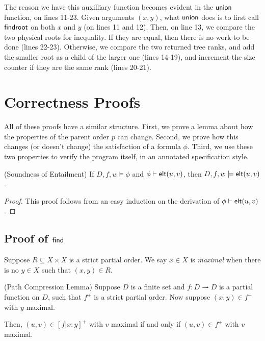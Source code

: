 The reason we have this auxilliary function becomes evident in the
$\mathsf{union}$ function, on lines 11-23. Given arguments $(x,y)$, what
$\mathsf{union}$ does is to first call $\mathsf{findroot}$ on both $x$ and $y$ (on
lines 11 and 12). Then, on line 13, we compare the two physical roots
for inequality. If they are equal, then there is no work to be done
(lines 22-23). Otherwise, we compare the two returned tree ranks, and
add the smaller root as a child of the larger one (lines 14-19), and
increment the size counter if they are the same rank (lines 20-21).

\section{Correctness Proofs}

All of these proofs have a similar structure. First, we prove a lemma about how 
the properties of the parent order $p$ can change. Second, we prove how this changes
(or doesn't change) the satisfaction of a formula $\phi$. Third, we use these
two properties to verify the program itself, in an annotated specification style.




\begin{lemma}{(Soundness of Entailment)}
  If $D, f, w \models \phi$ and ${\phi} \vdash \mathsf{elt}({u}, {v})$, then $D, f, w \models \mathsf{elt}({u}, {v})$. 
\end{lemma}

\begin{proof}
  This proof follows from an easy induction on the derivation of ${\phi} \vdash \mathsf{elt}({u}, {v})$. 
\end{proof}



\subsection{Proof of $\mathsf{find}$}

Suppose $R \subseteq X \times X$ is a strict partial order. We say $x \in X$ is \emph{maximal}
when there is no $y \in X$ such that $(x,y) \in R$. 

\begin{lemma}{(Path Compression Lemma)}
  Suppose $D$ is a finite set and $f : D \rightharpoonup D$ is a partial function on $D$,
such that $f^{+}$ is a strict partial order. Now suppose $(x,y) \in f^{+}$ with $y$ maximal.

Then, $(u,v) \in [f|x:y]^{+}$ with $v$ maximal if and only if $(u,v) \in f^{+}$ with $v$ maximal. 
\end{lemma}

